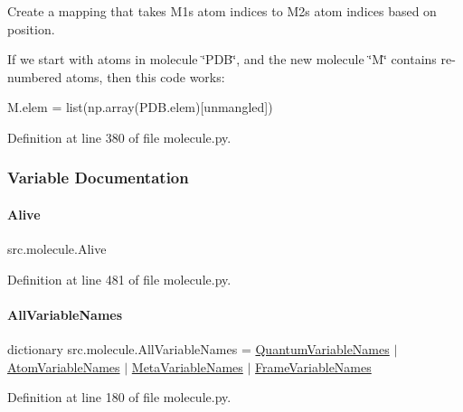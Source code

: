 Create a mapping that takes M1\textquotesingle{}s atom indices to M2\textquotesingle{}s atom indices based on position. 

If we start with atoms in molecule \char`\"{}\+P\+D\+B\char`\"{}, and the new molecule \char`\"{}\+M\char`\"{} contains re-\/numbered atoms, then this code works\+:

M.\+elem = list(np.\+array(P\+D\+B.\+elem)\mbox{[}unmangled\mbox{]}) 

Definition at line 380 of file molecule.\+py.



\subsubsection{Variable Documentation}
\mbox{\label{namespacesrc_1_1molecule_a7ceb335632b1368c941413a9788cc047}} 
\paragraph{\texorpdfstring{Alive}{Alive}}
{\footnotesize\ttfamily src.\+molecule.\+Alive}



Definition at line 481 of file molecule.\+py.

\mbox{\label{namespacesrc_1_1molecule_a9b73a8b86c4764462fb2c724062624a9}} 
\paragraph{\texorpdfstring{All\+Variable\+Names}{AllVariableNames}}
{\footnotesize\ttfamily dictionary src.\+molecule.\+All\+Variable\+Names = \hyperlink{namespacesrc_1_1molecule_a63e784c5358f77bcf929f5f5a312b845}{Quantum\+Variable\+Names} $\vert$ \hyperlink{namespacesrc_1_1molecule_a3c3c0e8c5e0c2a020713e1d7beba5269}{Atom\+Variable\+Names} $\vert$ \hyperlink{namespacesrc_1_1molecule_a4c6798b828fd919cc79a5d8193e8928a}{Meta\+Variable\+Names} $\vert$ \hyperlink{namespacesrc_1_1molecule_a16f4e1ba169d954ce12d9217c121305f}{Frame\+Variable\+Names}}



Definition at line 180 of file molecule.\+py.

